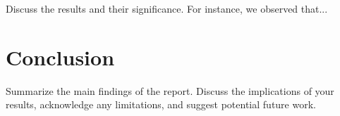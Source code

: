 \documentclass{article}
\begin{document}
Discuss the results and their significance. For instance, we observed that...

\section{Conclusion}
Summarize the main findings of the report. Discuss the implications of your results, acknowledge any limitations, and suggest potential future work.

\end{document}
